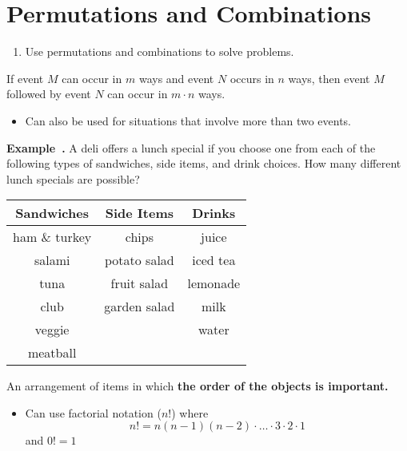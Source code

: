 \documentclass{article}
\newcounter{example}[section]
\newenvironment{example}[1][]{\refstepcounter{example}\par\medskip
   {\color{red}\textbf{Example~\theexample. #1}}}{\medskip}
\begin{document}
\section*{Permutations and Combinations}

\begin{tcolorbox}[colframe=orange!70!white, coltitle=black, title=\textbf{Today I Can}]
\begin{enumerate}
    \item Use permutations and combinations to solve problems.
\end{enumerate}
\end{tcolorbox}
\smallskip 

\begin{tcolorbox}[colframe=black!20!white, opacitybacktitle=0.1, coltitle=black, title=\textbf{Fundamental Counting Rule}]
If event $M$ can occur in $m$ ways and event $N$ occurs in $n$ ways, then event $M$ followed by event $N$ can occur in $m \cdot n$ ways.

\begin{itemize}
    \item Can also be used for situations that involve more than two events.
\end{itemize}
\end{tcolorbox}
\smallskip 

\begin{example}
A deli offers a lunch special if you choose one from each of the following types of sandwiches, side items, and drink choices. How many different lunch specials are possible?

\begin{center}
    \begin{tabular}{c|c|c}
        \textbf{Sandwiches} & \textbf{Side Items} & \textbf{Drinks} \\ \hline 
        ham \& turkey & chips & juice \\
        salami & potato salad & iced tea \\
        tuna & fruit salad & lemonade \\
        club & garden salad & milk \\ 
        veggie & & water \\ 
        meatball & & 
    \end{tabular}
\end{center}
\end{example}
\bigskip 

\begin{tcolorbox}[colframe=black!20!white, opacitybacktitle=0.1, coltitle=black, title=\textbf{Permutation}]
An arrangement of items in which \textbf{the order of the objects is important.} 

\begin{itemize}
    \item Can use factorial notation ($n!$) where
    \[
    n! = n(n-1)(n-2)\cdot \dots \cdot 3 \cdot 2 \cdot 1
    \]
    and $0! = 1$
\end{itemize}
\end{tcolorbox}
\smallskip 
\end{document}
